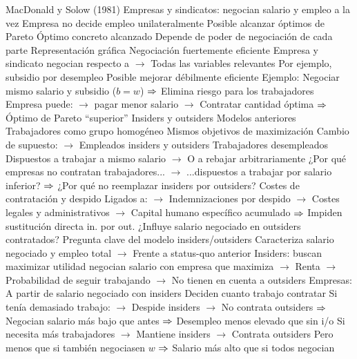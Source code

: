 \documentclass{nuevotema}
\begin{document}
\begin{esquemal}
				\4 MacDonald y Solow (1981)
				\4 Empresas y sindicatos:
				\4[] negocian salario y empleo a la vez
				\4[$\then$] Empresa no decide empleo unilateralmente
				\4[$\then$] Posible alcanzar óptimos de Pareto
				\4 Óptimo concreto alcanzado
				\4[] Depende de poder de negociación de cada parte
				\4 Representación gráfica
				\4[] 
			\3 Negociación fuertemente eficiente
				\4 Empresa y sindicato negocian respecto a
				\4[] $\to$ Todas las variables relevantes
				\4 Por ejemplo, subsidio por desempleo
				\4 Posible mejorar débilmente eficiente
				\4 Ejemplo:
				\4[] Negociar mismo salario y subsidio ($b=w$)
				\4[] $\then$ Elimina riesgo para los trabajadores
				\4[] Empresa puede:
				\4[] $\to$ pagar menor salario
				\4[] $\to$ Contratar cantidad óptima
				\4[] $\then$ Óptimo de Pareto ``superior''
			\3 Insiders y outsiders
				\4 Modelos anteriores
				\4[] Trabajadores como grupo homogéneo
				\4[] Mismos objetivos de maximización
				\4[] Cambio de supuesto:
				\4[] $\to$ Empleados insiders y outsiders
				\4 Trabajadores desempleados
				\4[] Dispuestos a trabajar a mismo salario
				\4[] $\to$ O a rebajar arbitrariamente
				\4[] ¿Por qué empresas no contratan trabajadores...
				\4[] $\to$ ...dispuestos a trabajar por salario inferior?
				\4[] $\then$ ¿Por qué no reemplazar insiders por outsiders?
				\4 Costes de contratación y despido
				\4[] Ligados a:
				\4[] $\to$ Indemnizaciones por despido
				\4[] $\to$ Costes legales y administrativos
				\4[] $\to$ Capital humano específico acumulado
				\4[] $\then$ Impiden sustitución directa in. por out.
				\4 ¿Influye salario negociado en outsiders contratados?
				\4[] Pregunta clave del modelo insiders/outsiders
				\4[] Caracteriza salario negociado y empleo total
				\4[] $\to$ Frente a status-quo anterior
				\4 Insiders:
				\4[] buscan maximizar utilidad
				\4[] negocian salario con empresa que maximiza
				\4[] $\to$ Renta
				\4[] $\to$ Probabilidad de seguir trabajando
				\4[] $\to$ No tienen en cuenta a outsiders
				\4 Empresas:
				\4[] A partir de salario negociado con insiders
				\4[] Deciden cuanto trabajo contratar
				\4[] Si tenía demasiado trabajo:
				\4[] $\to$ Despide insiders
				\4[] $\to$ No contrata outsiders
				\4[] $\then$ Negocian salario más bajo que antes
				\4[] $\then$ Desempleo menos elevado que sin i/o
				\4[] Si necesita más trabajadores
				\4[] $\to$ Mantiene insiders
				\4[] $\to$ Contrata outsiders
				\4[] \quad Pero menos que si también negociasen $w$
				\4[] $\then$ Salario más alto que si todos negocian

\end{esquemal}
\end{document}
